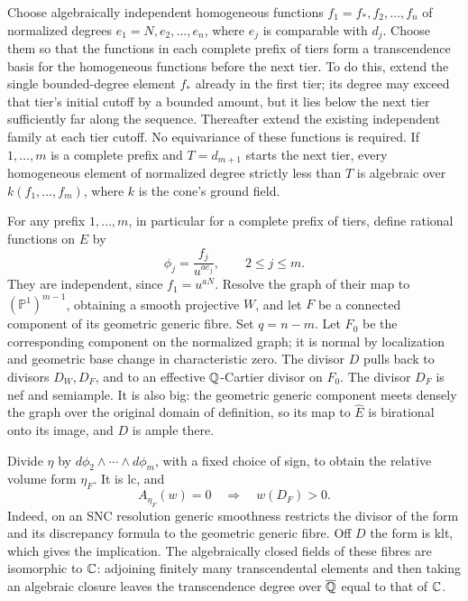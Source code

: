 Choose algebraically independent homogeneous functions
$f_1=f_*,f_2,\ldots,f_n$ of normalized degrees $e_1=N,e_2,\ldots,e_n$,
where $e_j$ is comparable with $d_j$.  Choose them so that the functions
in each complete prefix of tiers form a transcendence basis for the
homogeneous functions before the next tier.  To do this, extend the
single bounded-degree element $f_*$ already in the first tier; its
degree may exceed that tier's initial cutoff by a bounded amount, but
it lies below the next tier sufficiently far along the sequence.
Thereafter extend the existing independent family at each tier cutoff.
No equivariance of these functions is required.  If $1,\ldots,m$ is a
complete prefix and $T=d_{m+1}$ starts the next tier, every homogeneous
element of normalized degree strictly less than $T$ is algebraic over
$k(f_1,\ldots,f_m)$, where $k$ is the cone's ground field.

For any prefix $1,\ldots,m$, in particular for a complete prefix of
tiers, define rational functions on $\widehat E$ by
\begin{equation}\label{prod:pencils}
 \phi_j=\frac{f_j}{u^{ae_j}},\qquad 2\leq j\leq m.
\end{equation}
They are independent, since $f_1=u^{aN}$.  Resolve the graph of their
map to $(\mathbb P^1)^{m-1}$, obtaining a smooth projective $W$, and
let $F$ be a connected component of its geometric generic fibre.
Set $q=n-m$.  Let $F_0$ be the corresponding component on the
normalized graph; it is normal by localization and geometric base
change in characteristic zero.  The divisor $D$ pulls back to divisors
$D_W,D_F$, and to an effective $\mathbb Q$-Cartier divisor on $F_0$.
The divisor $D_F$ is nef and semiample.  It is also big: the geometric
generic component meets densely the graph over the original domain of
definition, so its map to $\widehat E$ is birational onto its image,
and $D$ is ample there.

Divide $\eta$ by
$d\phi_2\wedge\cdots\wedge d\phi_m$, with a fixed choice of sign, to
obtain the relative volume form $\eta_F$.  It is lc, and
\begin{equation}\label{prod:lc-poles}
 A_{\eta_F}(w)=0\quad\Longrightarrow\quad w(D_F)>0.
\end{equation}
Indeed, on an SNC resolution generic smoothness restricts the divisor
of the form and its discrepancy formula to the geometric generic
fibre.  Off $D$ the form is klt, which gives the implication.  The
algebraically closed fields of these fibres are isomorphic to $\mathbb C$:
adjoining finitely many transcendental elements and then taking an
algebraic closure leaves the transcendence degree over
$\overline{\mathbb Q}$ equal to that of $\mathbb C$.

